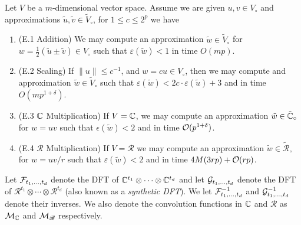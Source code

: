 \begin{proposition}
    Let $V$ be a $m$-dimensional vector space. Assume we are given $u, v \in V_\circ$ and approximations $\tilde{u}, \tilde{v} \in \tilde{V}_\circ$, for $1 \le c \le 2^p$ we have
    \begin{enumerate}
        \item (E.1 Addition) We may compute an approximation $\tilde{w} \in \tilde{V}_\circ$ for $w = \tfrac{1}{2}(\tilde{u} \pm \tilde{v}) \in V_\circ$ such that $\varepsilon(\tilde{w}) < 1$ in time $O(mp)$.
        \item (E.2 Scaling) If $\|u\| \le c^{-1}$, and $w = cu \in V_\circ$, then we may compute and approximation $\tilde{w} \in \tilde{V}_\circ$ such that $\varepsilon(\tilde{w}) < 2c \cdot \varepsilon(\tilde{u}) + 3$ and in time $O(mp^{1 + \delta})$.
        \item (E.3 ${\mathbb C}$ Multiplication) If $V = {\mathbb C}$, we may compute an approximation $\tilde{w} \in \tilde{{\mathbb C}}_\circ$ for $w = uv$ such that $\epsilon(\tilde{w}) < 2$ and in time $\mathcal O(p^{1 + \delta})$.
        \item (E.4 $\mathscr{R}$ Multiplication) If $V = \mathscr{R}$ we may compute an approximation $\tilde{w} \in \tilde{\mathscr{R}}_\circ$ for $w = uv/r$ such that $\varepsilon(\tilde{w}) < 2$ and in time $4M(3rp) + \mathcal O(rp)$.
    \end{enumerate}
\end{proposition}

Let $\mathcal F_{t_1, \ldots, t_d}$ denote the DFT of ${\mathbb C}^{t_1} \otimes \cdots \otimes {\mathbb C}^{t_d}$ and let $\mathcal G_{t_1, \ldots, t_d}$ denote the DFT of $\mathscr{R}^{t_1} \otimes \cdots \otimes \mathscr{R}^{t_d}$ (also known as a \emph{synthetic DFT}).
We let $\mathcal F^{-1}_{t_1, \ldots, t_d}$ and $\mathcal G_{t_1, \ldots, t_d}^{-1}$ denote their inverses.
We also denote the convolution functions in ${\mathbb C}$ and $\mathscr{R}$ as $\mathcal M_{\mathbb C}$ and $\mathcal M_\mathscr{R}$ respectively.

